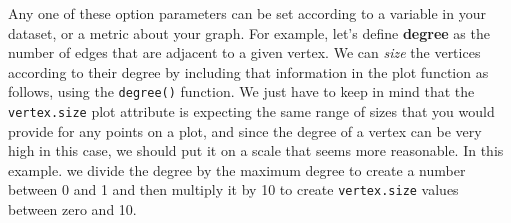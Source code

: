 \documentclass[
]{article}
\newenvironment{Shaded}{\begin{snugshade}}{\end{snugshade}}
\newcommand{\AttributeTok}[1]{\textcolor[rgb]{0.77,0.63,0.00}{#1}}
\newcommand{\DecValTok}[1]{\textcolor[rgb]{0.00,0.00,0.81}{#1}}
\newcommand{\FloatTok}[1]{\textcolor[rgb]{0.00,0.00,0.81}{#1}}
\newcommand{\FunctionTok}[1]{\textcolor[rgb]{0.00,0.00,0.00}{#1}}
\newcommand{\NormalTok}[1]{#1}
\newcommand{\SpecialCharTok}[1]{\textcolor[rgb]{0.00,0.00,0.00}{#1}}
\newcommand{\StringTok}[1]{\textcolor[rgb]{0.31,0.60,0.02}{#1}}
\theoremstyle{definition}
\theoremstyle{definition}
\theoremstyle{definition}
\theoremstyle{definition}
\theoremstyle{remark}
\begin{document}
Any one of these option parameters can be set according to a variable in your dataset, or a metric about your graph. For example, let's define \textbf{degree} as the number of edges that are adjacent to a given vertex. We can \emph{size} the vertices according to their degree by including that information in the plot function as follows, using the \texttt{degree()} function. We just have to keep in mind that the \texttt{vertex.size} plot attribute is expecting the same range of sizes that you would provide for any points on a plot, and since the degree of a vertex can be very high in this case, we should put it on a scale that seems more reasonable. In this example. we divide the degree by the maximum degree to create a number between 0 and 1 and then multiply it by 10 to create \texttt{vertex.size} values between zero and 10.

\begin{Shaded}
\end{Shaded}
\end{document}
